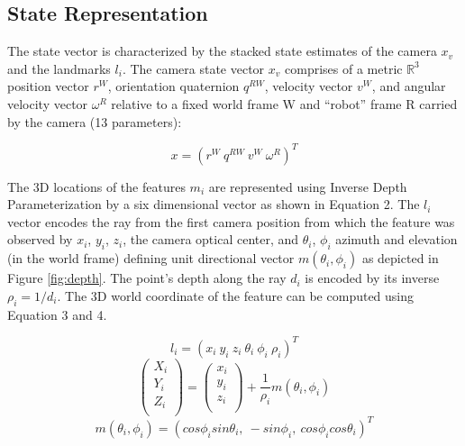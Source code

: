 \documentclass[conference]{IEEEtran}
\begin{document}
\subsection{State Representation}
The state vector is characterized by the stacked state estimates of the camera $x_v$ and the landmarks $l_i$. The camera state vector $x_v$ comprises of a metric $\mathbb{R}^3$ position vector $r^W$, orientation quaternion $q^{RW}$, velocity vector $v^W$, and angular velocity vector $\omega^{R}$ relative to a fixed world frame W and “robot” frame R carried by the camera (13 parameters):

\begin{equation}
x = ( r^{W} \ q^{RW} \ v^{W} \ \omega^{R})^{T}
\end{equation}

The 3D locations of the features $m_i$ are represented using Inverse Depth Parameterization \cite{inverse_depth} by a six dimensional vector as shown in Equation 2. The $l_i$ vector encodes the ray from the first camera position from which the feature was observed by $x_i$, $y_i$, $z_i$, the camera optical center, and $\theta_{i}$, $\phi_{i}$ azimuth and elevation (in the world frame) defining unit directional vector $m(\theta_{i}, \phi_{i})$ as depicted in Figure \ref{fig:depth}. The point's depth along the ray $d_i$ is encoded by its inverse $\rho_{i} = 1/d_{i}$. The 3D world coordinate of the feature can be computed using Equation 3 and 4.

\begin{equation}
l_i = ( x_i \  y_i \  z_i \ \theta_{i} \  \phi_{i} \ \rho_{i})^{T}
\end{equation}
\begin{equation}
\begin{pmatrix}
X_i \\
Y_i \\
Z_i \\ 
\end{pmatrix} =
\begin{pmatrix}
x_i \\
y_i \\
z_i \\
\end{pmatrix} + \frac{1}{\rho_{i}}m(\theta_{i}, \phi_{i})
\end{equation}
\begin{equation}
m(\theta_{i}, \phi_{i}) = (cos\phi_{i} sin\theta_{i},\ -sin\phi_{i},\ cos\phi_{i} cos\theta_{i})^{T}
\end{equation}
\end{document}
